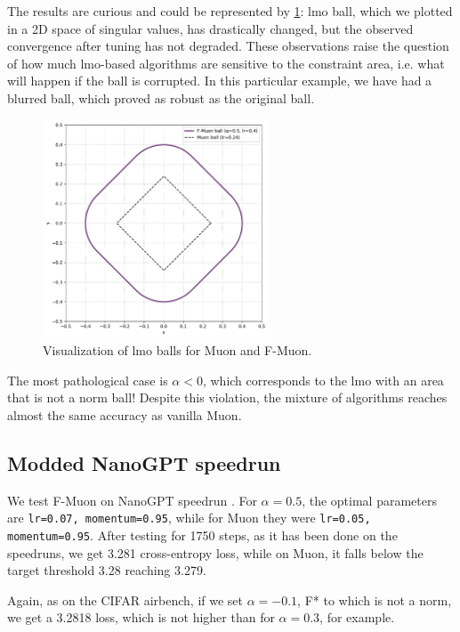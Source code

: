 \documentclass{article} %
\begin{document}
    The results are curious and could be represented by \cref{fig:cifar_ball}: lmo ball, which we plotted in a 2D space of singular values, has drastically changed, but the observed convergence after tuning has not degraded. These observations raise the question of how much lmo-based algorithms are sensitive to the constraint area, i.e. what will happen if the ball is corrupted. In this particular example, we have had a blurred ball, which proved as robust as the original ball.

    \begin{figure}[h]
        \centering
        \includegraphics[width=0.6\textwidth]{figs/fstardual_cifar.pdf} %
        \caption{Visualization of lmo balls for Muon and F-Muon.}
        \label{fig:cifar_ball}
    \end{figure}

    The most pathological case is $\alpha < 0$, which corresponds to the lmo with an area that is not a norm ball! Despite this violation, the mixture of algorithms reaches almost the same accuracy as vanilla Muon.

    \subsection{Modded NanoGPT speedrun}
    We test F-Muon on NanoGPT speedrun \citep{modded_nanogpt_2024}. For $\alpha = 0.5$, the optimal parameters are {\tt lr=0.07, momentum=0.95}, while for Muon they were  {\tt lr=0.05, momentum=0.95}. After testing for 1750 steps, as it has been done on the speedruns, we get 3.281 cross-entropy loss, while on Muon, it falls below the target threshold 3.28 reaching 3.279.

    Again, as on the CIFAR airbench, if we set $\alpha=-0.1$, F* to which is not a norm, we get a 3.2818 loss, which is not higher than for $\alpha=0.3$, for example.
\end{document}
